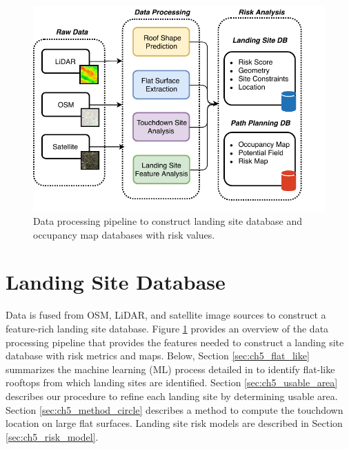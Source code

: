 \begin{figure}[!t]
    \centering
    \includegraphics[clip, trim=0.0cm 0cm 0cm 0cm, width=0.7\linewidth]{chapter_5_mapping/imgs/data_preprocessing-Page-1.pdf}
    \caption[Data processing pipeline for landing sites]{Data processing pipeline to construct landing site database and occupancy map databases with risk values.}
    \label{fig:ch5_overview_processing}
\end{figure}

\section{Landing Site Database}\label{sec:ch5_landing_site_database}

 Data is fused from OSM, LiDAR, and satellite image sources to construct a feature-rich landing site database. Figure \ref{fig:ch5_overview_processing} provides an overview of the data processing pipeline that provides the features needed to construct a landing site database with risk metrics and maps.
Below, Section \ref{sec:ch5_flat_like} summarizes the machine learning (ML) process detailed in \cite{castagno_comprehensive_2018} to identify flat-like rooftops from which landing sites are identified. Section \ref{sec:ch5_usable_area} describes our procedure to refine each landing site by determining usable area. Section \ref{sec:ch5_method_circle} describes a method to compute the touchdown location on large flat surfaces. Landing site risk models are described in Section \ref{sec:ch5_risk_model}.

